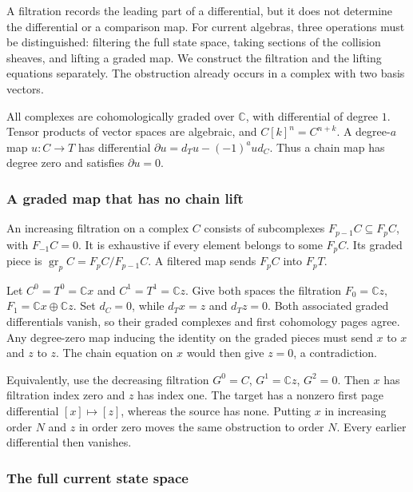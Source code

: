 A filtration records the leading part of a differential, but it does not determine the differential or a comparison map.
For current algebras, three operations must be distinguished: filtering the full state space, taking sections of the collision sheaves, and lifting a graded map.
We construct the filtration and the lifting equations separately.
The obstruction already occurs in a complex with two basis vectors.

All complexes are cohomologically graded over $\mathbb C$, with differential of degree $1$.
Tensor products of vector spaces are algebraic, and $C[k]^n=C^{n+k}$.
A degree-$a$ map $u:C\to T$ has differential
$\partial u=d_Tu-(-1)^a u d_C$.
Thus a chain map has degree zero and satisfies $\partial u=0$.

\subsubsection{A graded map that has no chain lift}

An increasing filtration on a complex $C$ consists of subcomplexes
$F_{p-1}C\subseteq F_pC$, with $F_{-1}C=0$.
It is exhaustive if every element belongs to some $F_pC$.
Its graded piece is $\operatorname{gr}_p C=F_pC/F_{p-1}C$.
A filtered map sends $F_pC$ into $F_pT$.

\begin{example}\label{ex:fl19-no-lift}
Let $C^0=T^0=\mathbb Cx$ and $C^1=T^1=\mathbb Cz$.
Give both spaces the filtration
$F_0=\mathbb Cz$, $F_1=\mathbb Cx\oplus\mathbb Cz$.
Set $d_C=0$, while $d_Tx=z$ and $d_Tz=0$.
Both associated graded differentials vanish, so their graded complexes and first cohomology pages agree.
Any degree-zero map inducing the identity on the graded pieces must send $x$ to $x$ and $z$ to $z$.
The chain equation on $x$ would then give $z=0$, a contradiction.

Equivalently, use the decreasing filtration
$G^0=C$, $G^1=\mathbb Cz$, $G^2=0$.
Then $x$ has filtration index zero and $z$ has index one.
The target has a nonzero first page differential $[x]\mapsto[z]$, whereas the source has none.
Putting $x$ in increasing order $N$ and $z$ in order zero moves the same obstruction to order $N$.
Every earlier differential then vanishes.
\end{example}

\subsubsection{The full current state space}

